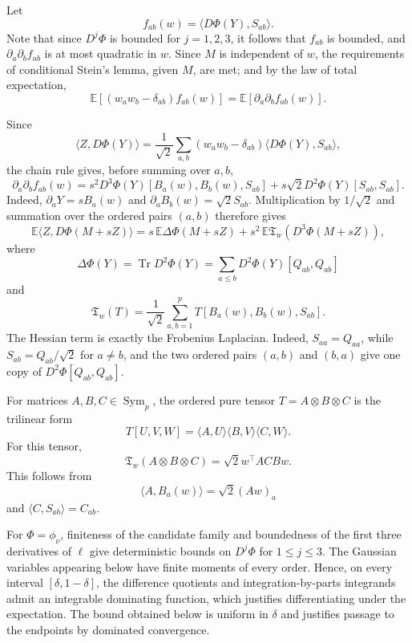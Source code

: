 \documentclass[11pt]{article}
\numberwithin{equation}{section}
\theoremstyle{definition}
\theoremstyle{remark}
\newcommand{\E}{\mathbb E}
\newcommand{\1}{\boldsymbol 1}
\begin{document}
\begin{aiblock}
Let
\[
    f_{ab}(w) = \langle D\Phi(Y), S_{ab} \rangle.
\]
Note that since $D^j\Phi$ is bounded for $j = 1, 2, 3$, it follows that $f_{ab}$ is bounded, and $\partial_a\partial_b f_{ab}$ is at most quadratic in $w$.
Since $M$ is independent of $w$, the requirements of conditional Stein's lemma, given $M$, are met; and by the law of total expectation,
\[
    \E[(w_a w_b - \delta_{ab}) f_{ab}(w)] = \E[\partial_a \partial_b f_{ab}(w)].
\]

Since
\[
  \langle Z, D\Phi(Y) \rangle = \frac{1}{\sqrt{2}} \sum_{a,b} (w_a w_b - \delta_{ab}) \langle D\Phi(Y), S_{ab} \rangle,
\]
the chain rule gives, before summing over $a, b$,
\[
    \partial_a\partial_b f_{ab}(w) = s^2 D^3\Phi(Y)[B_a(w), B_b(w), S_{ab}] + s \sqrt{2} D^2\Phi(Y)[S_{ab}, S_{ab}].
\]
Indeed, $\partial_a Y = s B_a(w)$ and $\partial_a B_b(w) = \sqrt{2} S_{ab}$. Multiplication by $1/\sqrt{2}$ and summation over the ordered pairs $(a, b)$ therefore gives
\[
    \E\langle Z, D\Phi(M + s Z) \rangle = s \, \E\Delta\Phi(M + s Z) + s^2 \, \E\mathfrak T_w(D^3\Phi(M + sZ)),
\]
where
\[
    \Delta\Phi(Y) = \operatorname{Tr} D^2 \Phi(Y) = \sum_{a \leq b} D^2\Phi(Y)[Q_{ab}, Q_{ab}]
\]
and
\[
    \mathfrak T_w(T) = \frac{1}{\sqrt{2}} \sum_{a, b = 1}^p T[B_a(w), B_b(w), S_{ab}].
\]
The Hessian term is exactly the Frobenius Laplacian.
Indeed, $S_{aa} = Q_{aa}$, while $S_{ab} = Q_{ab}/\sqrt{2}$ for $a \ne b$, and the two ordered pairs $(a, b)$ and $(b, a)$ give one copy of $D^2\Phi[Q_{ab}, Q_{ab}]$.

For matrices $A,B,C \in \operatorname{Sym}_p$, the ordered pure tensor $T = A \otimes B \otimes C$ is the trilinear form
\[
    T[U,V,W] = \langle A, U \rangle \langle B, V \rangle \langle C, W \rangle.
\]
For this tensor,
\[
    \mathfrak T_w(A \otimes B \otimes C) = \sqrt{2} w^\top A C B w.
\]
This follows from
\[
    \langle A, B_a(w) \rangle = \sqrt{2}(A w)_a
\]
and $\langle C, S_{ab} \rangle = C_{ab}$.



For $\Phi=\phi_\nu$, finiteness of the candidate family and boundedness of the first three derivatives of $\ell$ give deterministic bounds on $D^j\Phi$ for $1 \le j \le 3$.
The Gaussian variables appearing below have finite moments of every order. Hence, on every interval $[\delta, 1 - \delta]$, the difference quotients and
integration-by-parts integrands admit an integrable dominating function, which justifies differentiating under the expectation. The bound obtained below is uniform in $\delta$ and justifies passage to the endpoints by dominated convergence.


\end{aiblock}
\end{document}
